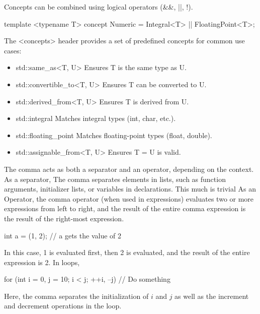 \documentclass{report}
\begin{document}
    \bigbreak \noindent 
    Concepts can be combined using logical operators (\&\&, ||, !).
    \bigbreak \noindent 
    \begin{cppcode}
    template <typename T>
    concept Numeric = Integral<T> || FloatingPoint<T>;
\end{cppcode}
\bigbreak \noindent 
The <concepts> header provides a set of predefined concepts for common use cases:
\begin{itemize}
    \item std::same\_as<T, U>	Ensures T is the same type as U.
    \item std::convertible\_to<T, U>	Ensures T can be converted to U.
    \item std::derived\_from<T, U>	Ensures T is derived from U.
    \item std::integral	Matches integral types (int, char, etc.).
    \item std::floating\_point	Matches floating-point types (float, double).
    \item std::assignable\_from<T, U>	Ensures T = U is valid.
\end{itemize}












     \pagebreak 
     \bigbreak \noindent 
     The comma acts as both a separator and an operator, depending on the context.
     \bigbreak \noindent 
     As a separator, The comma separates elements in lists, such as function arguments, initializer lists, or variables in declarations. This much is trivial
     \bigbreak \noindent 
     As an Operator, the comma operator (when used in expressions) evaluates two or more expressions from left to right, and the result of the entire comma expression is the result of the right-most expression.
     \bigbreak \noindent 
     \begin{cppcode}
     int a = (1, 2);  // a gets the value of 2
     \end{cppcode}
     \bigbreak \noindent 
     In this case, 1 is evaluated first, then 2 is evaluated, and the result of the entire expression is 2.
     \bigbreak \noindent 
     In loops, 
     \bigbreak \noindent 
     \begin{cppcode}
         for (int i = 0, j = 10; i < j; ++i, --j) {
             // Do something
         }
     \end{cppcode}
     \bigbreak \noindent 
     Here, the comma separates the initialization of $i$ and $j$ as well as the increment and decrement operations in the loop.
\end{document}
